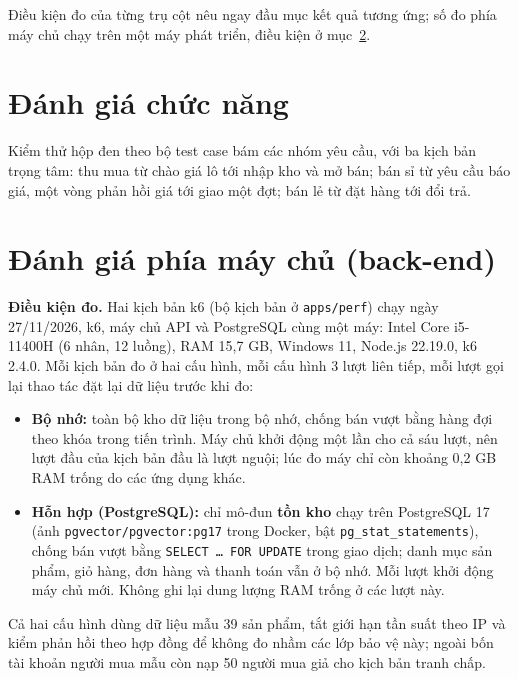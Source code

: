 Điều kiện đo của từng trụ cột nêu ngay đầu mục kết quả tương ứng; số đo phía máy chủ chạy trên một máy phát triển, điều kiện ở mục~\ref{sec:danhgiahieunang}.

\section{Đánh giá chức năng}
\label{sec:danhgiachucnang}

Kiểm thử hộp đen theo bộ test case bám các nhóm yêu cầu, với ba kịch bản trọng tâm: thu mua từ chào giá lô tới nhập kho và mở bán; bán sỉ từ yêu cầu báo giá, một vòng phản hồi giá tới giao một đợt; bán lẻ từ đặt hàng tới đổi trả.


\section{Đánh giá phía máy chủ (back-end)}
\label{sec:danhgiahieunang}

\noindent\textbf{Điều kiện đo.} Hai kịch bản k6 (bộ kịch bản ở \texttt{apps/perf}) chạy ngày 27/11/2026, k6, máy chủ API và PostgreSQL cùng một máy: Intel Core i5-11400H (6 nhân, 12 luồng), RAM 15,7 GB, Windows 11, Node.js 22.19.0, k6 2.4.0. Mỗi kịch bản đo ở hai cấu hình, mỗi cấu hình 3 lượt liên tiếp, mỗi lượt gọi lại thao tác đặt lại dữ liệu trước khi đo:
\begin{itemize}
    \item \textbf{Bộ nhớ:} toàn bộ kho dữ liệu trong bộ nhớ, chống bán vượt bằng hàng đợi theo khóa trong tiến trình. Máy chủ khởi động một lần cho cả sáu lượt, nên lượt đầu của kịch bản đầu là lượt nguội; lúc đo máy chỉ còn khoảng 0,2 GB RAM trống do các ứng dụng khác.
    \item \textbf{Hỗn hợp (PostgreSQL):} chỉ mô-đun \textbf{tồn kho} chạy trên PostgreSQL 17 (ảnh \texttt{pgvector/pgvector:pg17} trong Docker, bật \texttt{pg\_stat\_statements}), chống bán vượt bằng \texttt{SELECT \ldots{} FOR UPDATE} trong giao dịch; danh mục sản phẩm, giỏ hàng, đơn hàng và thanh toán vẫn ở bộ nhớ. Mỗi lượt khởi động máy chủ mới. Không ghi lại dung lượng RAM trống ở các lượt này.
\end{itemize}
Cả hai cấu hình dùng dữ liệu mẫu 39 sản phẩm, tắt giới hạn tần suất theo IP và kiểm phản hồi theo hợp đồng để không đo nhầm các lớp bảo vệ này; ngoài bốn tài khoản người mua mẫu còn nạp 50 người mua giả cho kịch bản tranh chấp.

